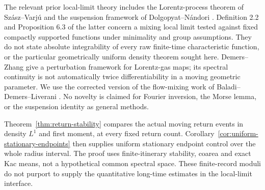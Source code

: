 The relevant prior local-limit theory includes the Lorentz-process theorem of Sz\'asz--Varj\'u \cite{SV} and the suspension framework of Dolgopyat--N\'andori \cite{DN}. Definition 2.2 and Proposition 6.3 of the latter concern a mixing local limit tested against fixed compactly supported functions under minimality and group assumptions. They do not state absolute integrability of every raw finite-time characteristic function, or the particular geometrically uniform density theorem sought here. Demers--Zhang \cite{DZ} give a perturbation framework for Lorentz-gas maps; its spectral continuity is not automatically twice differentiability in a moving geometric parameter. We use the corrected version of the flow-mixing work of Baladi--Demers--Liverani \cite{BDL}. No novelty is claimed for Fourier inversion, the Morse lemma, or the suspension identity as general methods.


Theorem~\ref{thm:return-stability} compares the actual moving return
events in density $L^1$ and first moment, at every fixed return count.
Corollary~\ref{cor:uniform-stationary-endpoints} then supplies uniform
stationary endpoint control over the whole radius interval. The proof uses
finite-itinerary stability, coarea and exact Kac means, not a hypothetical
common spectral space. These finite-record moduli do not purport to supply
the quantitative long-time estimates in the local-limit interface.
